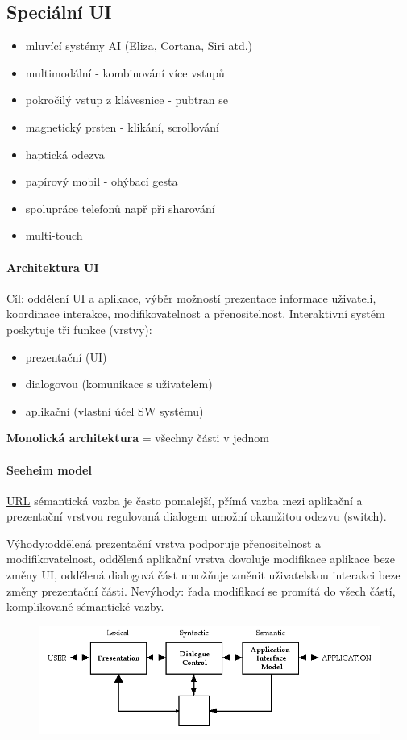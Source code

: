 \subsection{Speciální UI}
\begin{itemize}[itemsep=0px]
\item mluvící systémy AI (Eliza, Cortana, Siri atd.)
\item multimodální - kombinování více vstupů
\item pokročilý vstup z klávesnice - pubtran se 
\item magnetický prsten - klikání, scrollování
\item haptická odezva
\item papírový mobil - ohýbací gesta
\item spolupráce telefonů např při sharování
\item multi-touch
\end{itemize}


\paragraph{Architektura UI}
Cíl: oddělení UI a aplikace, výběr možností prezentace informace uživateli, koordinace interakce, modifikovatelnost a přenositelnost. Interaktivní systém poskytuje tři funkce (vrstvy):
\begin{itemize}[itemsep=0px]
\item prezentační (UI)
\item dialogovou (komunikace s uživatelem)
\item aplikační (vlastní účel SW systému)
\end{itemize}
\textbf{Monolická architektura} = všechny části v jednom

\paragraph{Seeheim model}
\href{http://centurion2.com/SEHomework/UserInterfaceDesign/UserInterfaceDesign.php#SeeheimModel}{URL}
sémantická vazba je často pomalejší, přímá vazba mezi aplikační a prezentační vrstvou regulovaná dialogem umožní okamžitou odezvu (switch).

Výhody:oddělená prezentační vrstva podporuje přenositelnost a modifikovatelnost, oddělená aplikační vrstva dovoluje modifikace aplikace beze změny UI, oddělená dialogová část umožňuje změnit uživatelskou interakci beze změny prezentační části.
Nevýhody: řada modifikací se promítá do všech částí, komplikované sémantické vazby.

\begin{figure}[h!]
\centering
\includegraphics[width=125mm]{03/images/seeheim}
\end{figure}